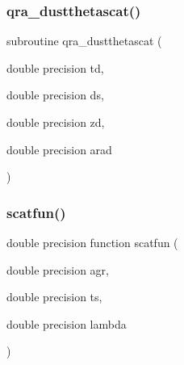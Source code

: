 \subsubsection{\texorpdfstring{qra\+\_\+dustthetascat()}{qra\_dustthetascat()}}
{\footnotesize\ttfamily subroutine qra\+\_\+dustthetascat (\begin{DoxyParamCaption}\item[{double precision}]{td,  }\item[{double precision}]{ds,  }\item[{double precision}]{zd,  }\item[{double precision}]{arad }\end{DoxyParamCaption})}

\mbox{\label{qra__dust_8f_a993fd66229d12e6af7bf7aa8873f4eb5}} 
\subsubsection{\texorpdfstring{scatfun()}{scatfun()}}
{\footnotesize\ttfamily double precision function scatfun (\begin{DoxyParamCaption}\item[{double precision}]{agr,  }\item[{double precision}]{ts,  }\item[{double precision}]{lambda }\end{DoxyParamCaption})}

